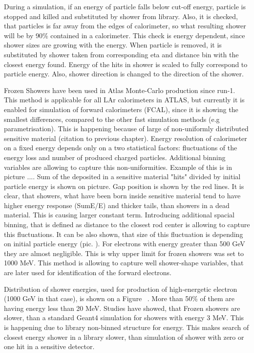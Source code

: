 During a simulation, if an energy of particle falls below cut-off energy, particle is stopped and killed and substituted by shower from library. Also, it is checked, that particles is far away from the edges of calorimeter, so what resulting shower will be by 90\% contained in a calorimeter. This check is energy dependent, since shower sizes are growing with the energy. 
When particle is removed, it is substituted by shower taken from corresponding eta and distance bin with the closest energy found. Energy of the hits in shower is scaled to fully correspond to particle energy. Also, shower direction is changed to the direction of the shower.

Frozen Showers have been used in Atlas Monte-Carlo production since run-1. This method is applicable for all LAr calorimeters in ATLAS, but currently it is enabled for simulation of forward calorimeters (FCAL), since it is showing the smallest differences, compared to the other fast simulation methods (e.g parametrisation). This is happening because of large of non-uniformly distributed sensitive material (citation to previous chapter). Energy resolution of calorimeter on a fixed energy depends only on a two statistical factors: fluctuations of the energy loss and number of produced charged particles. Additional binning variables are allowing to capture this non-uniformities. Example of this is in picture .... Sum of the deposited in a sensitive material "hits" divided by initial particle energy is shown on picture. Gap position is shown by the red lines. It is clear, that showers, what have been born inside sensitive material tend to have higher energy response (SumE/E) and thicker tails, than showers in a dead material. This is causing larger constant term. Introducing additional spacial binning, that is defined as distance to the closest rod center is allowing to capture this fluctuations. It can be also shown, that size of this fluctuation is depending on initial particle energy (pic. ). For electrons with energy greater than 500 GeV they are almost negligible. This is why upper limit for frozen showers was set to 1000 MeV.
This method is allowing to capture well shower-shape variables, that are later used for identification of the forward electrons. 
\begin{figure}
\end{figure}
Distribution of shower energies, used for production of high-energetic electron (1000 GeV in that case), is shown on a Figure ~. More than 50\% of them are having energy less than 20 MeV. Studies have showed, that Frozen showers are slower, than a standard Geant4 simulation for showers with energy 3 MeV. This is happening due to library non-binned structure for energy. This makes search of closest energy shower in a library slower, than simulation of shower with zero or one hit in a sensitive detector. 

